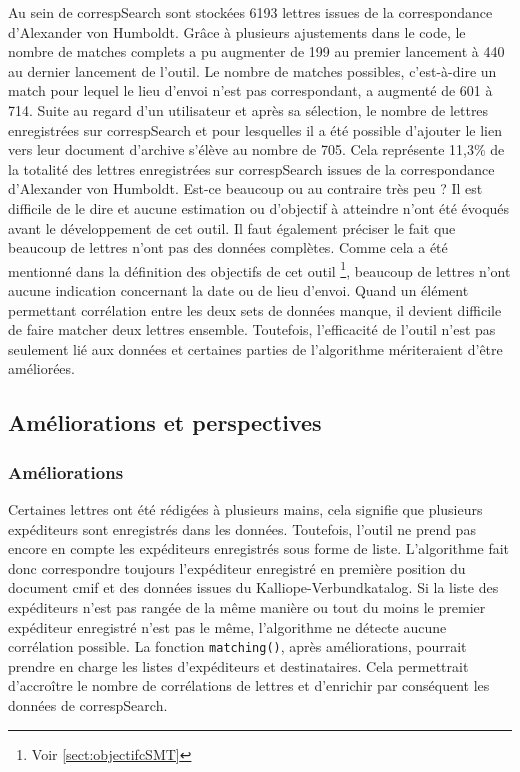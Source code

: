 \documentclass[a4paper, 12pt, twoside]{book}
\begin{document}
Au sein de correspSearch sont stockées 6193 lettres issues de la correspondance d'Alexander von Humboldt. Grâce à plusieurs ajustements dans le code, le nombre de matches complets a pu augmenter de 199 au premier lancement à 440 au dernier lancement de l'outil. Le nombre de matches possibles, c'est-à-dire un match pour lequel le lieu d'envoi n'est pas correspondant, a augmenté de 601 à 714. Suite au regard d'un utilisateur et après sa sélection, le nombre de lettres enregistrées sur correspSearch et pour lesquelles il a été possible d'ajouter le lien vers leur document d'archive s'élève au nombre de 705. Cela représente 11,3\% de la totalité des lettres enregistrées sur correspSearch issues de la correspondance d'Alexander von Humboldt. Est-ce beaucoup ou au contraire très peu ? Il est difficile de le dire et aucune estimation ou d'objectif à atteindre n'ont été évoqués avant le développement de cet outil. Il faut également préciser le fait que beaucoup de lettres n'ont pas des données complètes. Comme cela a été mentionné dans la définition des objectifs de cet outil \footnote{Voir \autoref{sect:objectifcSMT}}, beaucoup de lettres n'ont aucune indication concernant la date ou de lieu d'envoi. Quand un élément permettant corrélation entre les deux sets de données manque, il devient difficile de faire matcher deux lettres ensemble. Toutefois, l'efficacité de l'outil n'est pas seulement lié aux données et certaines parties de l'algorithme mériteraient d'être améliorées. 

\subsection{Améliorations et perspectives}
\subsubsection{Améliorations}
Certaines lettres ont été rédigées à plusieurs mains, cela signifie que plusieurs expéditeurs sont enregistrés dans les données. Toutefois, l'outil ne prend pas encore en compte les expéditeurs enregistrés sous forme de liste. L'algorithme fait donc correspondre toujours l'expéditeur enregistré en première position du document \gls{cmif} et des données issues du Kalliope-Verbundkatalog. Si la liste des expéditeurs n'est pas rangée de la même manière ou tout du moins le premier expéditeur enregistré n'est pas le même, l'algorithme ne détecte aucune corrélation possible. La fonction \texttt{matching()}, après améliorations, pourrait prendre en charge les listes d'expéditeurs et destinataires. Cela permettrait d'accroître le nombre de corrélations de lettres et d'enrichir par conséquent les données de correspSearch.
\end{document}
